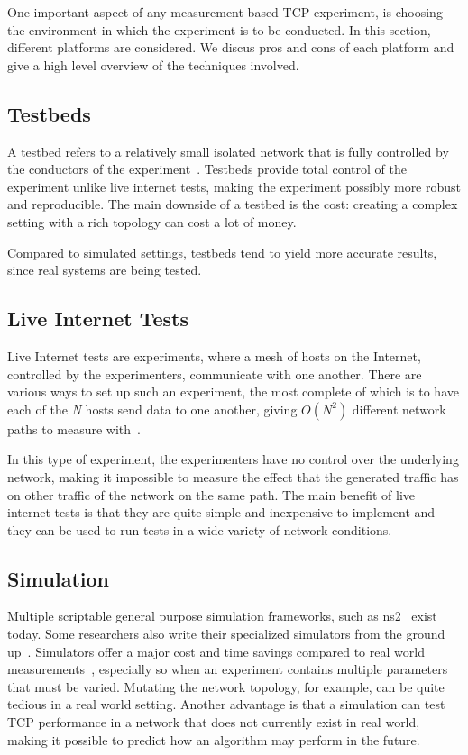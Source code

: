 One important aspect of any measurement based TCP experiment, is choosing the environment in which the experiment is to be conducted. In this section, different platforms are considered. We discus pros and cons of each platform and give a high level overview of the techniques involved.  

\subsection{Testbeds}

A testbed refers to a relatively small isolated network that is fully controlled by the conductors of the experiment~\cite{Allman99}. Testbeds provide total control of the experiment unlike live internet tests, making the experiment possibly more robust and reproducible. The main downside of a testbed is the cost: creating a complex setting with a rich topology can cost a lot of money. 

Compared to simulated settings, testbeds tend to yield more accurate results, since real systems are being tested. 

\subsection{Live Internet Tests}

Live Internet tests are experiments, where a mesh of hosts on the Internet, controlled by the experimenters, communicate with one another. There are various ways to set up such an experiment, the most complete of which is to have each of the \textit{N} hosts send data to one another, giving \textit{$O(N^2)$} different network paths to measure with~\cite{Allman99}.

In this type of experiment, the experimenters have no control over the underlying network, making it impossible to measure the effect that the generated traffic has on other traffic of the network on the same path. The main benefit of live internet tests is that they are quite simple and inexpensive to implement and they can be used to run tests in a wide variety of network conditions.

\subsection{Simulation} 

Multiple scriptable general purpose simulation frameworks, such as ns2~\cite{Singh12} exist today. Some researchers also write their specialized simulators from the ground up~\cite{Allman99}. Simulators offer a major cost and time savings compared to real world measurements~\cite{Allman99}, especially so when an experiment contains multiple parameters that must be varied. Mutating the network topology, for example, can be quite tedious in a real world setting. Another advantage is that a simulation can test TCP performance in a network that does not currently exist in real world, making it possible to predict how an algorithm may perform in the future.   

